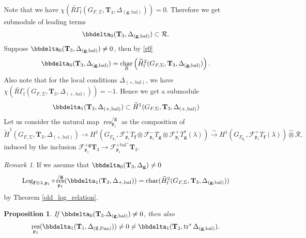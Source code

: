 \documentclass[10pt]{amsart}
\numberwithin{equation}{section}
\newtheorem{prop}[thm]{Proposition}
\theoremstyle{definition}
\theoremstyle{remark} %
\newtheorem{rmk}[thm]{Remark}
\DeclareMathOperator{\Char}{char}
\newcommand{\Log}{\operatorname{Log}}
\newcommand{\pan}{\mathrm{Pan}}
\DeclareMathOperator{\res}{res}
\DeclareMathOperator{\tr}{{tr}^*}
\renewcommand{\b}{\mathrm{bal}}
\newcommand{\f}{\mathbf{f}}
\newcommand{\scrF}{\mathscr{F}}
\newcommand{\g}{\mathbf{g}}
\newcommand{\p}{\mathfrak{p}}
\newcommand{\R}{\mathcal{R}}
\newcommand{\T}{\mathbf{T}}
\newcommand{\cohom}{\widetilde{H}_{\mathrm{f}}}
\begin{document}
		\subsubsection{}
		Note that we have $\chi(\widetilde{R\Gamma}_{\mathrm{f}}(G_{F,\Sigma},\T_{3},\Delta_{(\g,\b)})) =0$. Therefore we get submodule of leading terms
		\begin{equation}
			\bbdelta_0(\T_{3},\Delta_{(\g,\b)})  \subset \R.
		\end{equation}
		Suppose $ \bbdelta_0(\T_{3},\Delta_{(\g,\b)}) \ne 0 $, then by \cref{r0} 
		\begin{align}
			\label{6.10}
			\bbdelta_0(\T_{3},\Delta_{(\g,\b)}) = \Char_R\left(\cohom^2(G_{F,\Sigma},\T_{3},\Delta_{(\g,\b)})\right).
		\end{align} 
		Also note that for the local conditions $ \Delta_{(+,\b)} $, we have $ \chi(\widetilde{R\Gamma}_{\mathrm{f}}(G_{F,\Sigma}, \T_{3}, \Delta_{(+,\b)})) =-1 $. Hence we get a submodule $$ \bbdelta_1(\T_{3},\Delta_{(+,\b)}) \subset \widetilde{H}^1(G_{F,\Sigma}, \T_{3}, \Delta_{(+,\b)}) $$
		Let us consider the natural map $ \res^{/\g}_{\p_1} $ as the composition of 
		\begin{equation*}
			\widetilde{H}^1(G_{F,\Sigma}, \T_{3}, \Delta_{(+,\b)}) \rightarrow  H^1(G_{F_{\p_1}}, \scrF^+_{\p_1}T_{\f} \otimes \scrF^-_{\p_1}T_{\g} \otimes \scrF^+_{\p_1}T_{\g}^*(\lambda)) \xrightarrow{\sim}  H^1(G_{F_{\p_1}}, \scrF^+_{\p_1}T_{\f}(\lambda)) \widehat{\otimes} \R ,
		\end{equation*}
		induced by the inclusion $ \scrF^{+\g}_{\p_1} \T_{3} \rightarrow \scrF^{+\mathrm{bal}^+}_{\p_1} \T_{3} $.
		\begin{rmk}
			\label{remark1_T3}
			If we assume that $ \bbdelta_0(\T_{3},\Delta_{\g}) \ne 0 $
			$$  \Log_{\f \otimes \lambda,\p_1}\circ\res^{/\g}_{\p_1}(\bbdelta_1(\T_{3},\Delta_{+,\b})) = \Char (\widetilde{H}^2_{\mathrm{f}}(G_{F,\Sigma}, \T_3, \Delta_{(\g,\b)}))  $$
			by Theorem \ref{old_log_relation}.
		\end{rmk}
		\begin{prop}
			If $ \bbdelta_0(\T_{3}.\Delta_{(\g,\b)}) \ne 0 $, then also 
			$$ \res_{\p_1}(\bbdelta_1(\T_{1}, \Delta_{(\emptyset,\pan)})) \ne 0 \ne \bbdelta_1(\T_{2}, \tr\Delta_{(\g,\b)}). $$
		\end{prop}
\end{document}

